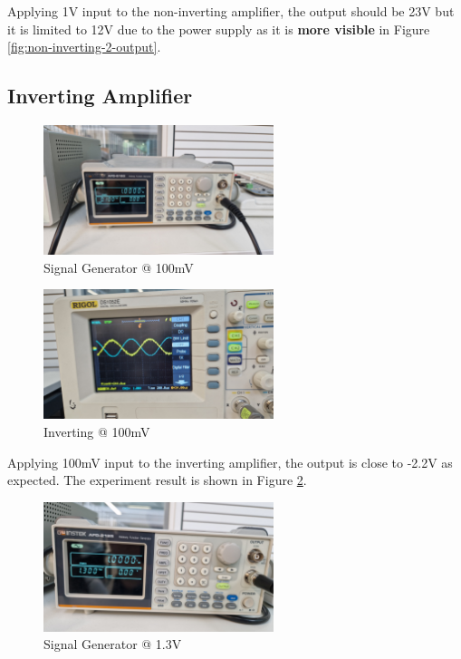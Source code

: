 Applying 1V input to the non-inverting amplifier, the output should be 23V but it is limited to 12V due to the power supply as it is \textbf{more visible} in Figure \ref{fig:non-inverting-2-output}.

\newpage
\thispagestyle{plain}

\subsection{Inverting Amplifier}

\begin{figure}[h]
    \centering
    \includegraphics[width=0.6\textwidth]{assets/inverting-100.jpg}
    \caption{Signal Generator @ 100mV}
    \label{fig:inverting-100m}
\end{figure}

\begin{figure}[h]
    \centering
    \includegraphics[width=0.6\textwidth]{assets/inverting-100-output.jpg}
    \caption{Inverting @ 100mV}
    \label{fig:inverting-100m-output}
\end{figure}

Applying 100mV input to the inverting amplifier, the output is close to -2.2V as expected. The experiment result is shown in Figure \ref{fig:inverting-100m-output}.

\newpage
\thispagestyle{plain}

\begin{figure}[h]
    \centering
    \includegraphics[width=0.6\textwidth]{assets/inverting-1.3.jpg}
    \caption{Signal Generator @ 1.3V}
    \label{fig:inverting-1.3}
\end{figure}

